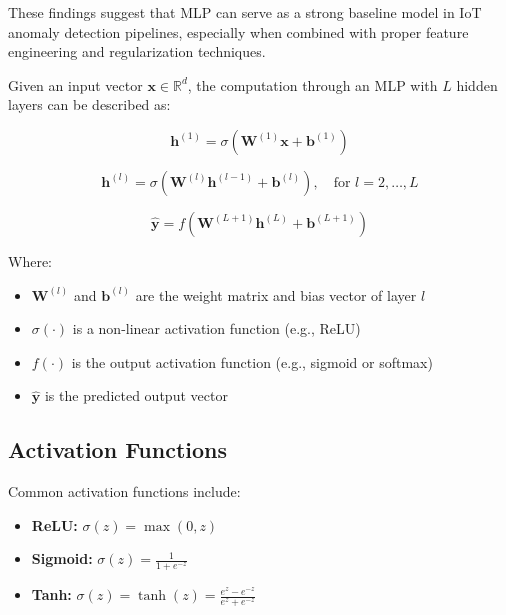 \begin{ZhChapter}
These findings suggest that MLP can serve as a strong baseline model in IoT anomaly detection pipelines, especially when combined with proper feature engineering and regularization techniques.

Given an input vector $\mathbf{x} \in \mathbb{R}^d$, the computation through an MLP with $L$ hidden layers can be described as:

\begin{equation}
    \mathbf{h}^{(1)} = \sigma\left( \mathbf{W}^{(1)} \mathbf{x} + \mathbf{b}^{(1)} \right)
    \label{eq:mlp_layer1}
\end{equation}

\begin{equation}
    \mathbf{h}^{(l)} = \sigma\left( \mathbf{W}^{(l)} \mathbf{h}^{(l-1)} + \mathbf{b}^{(l)} \right), \quad \text{for } l=2, \dots, L
    \label{eq:mlp_hidden}
\end{equation}

\begin{equation}
    \hat{\mathbf{y}} = f\left( \mathbf{W}^{(L+1)} \mathbf{h}^{(L)} + \mathbf{b}^{(L+1)} \right)
    \label{eq:mlp_output}
\end{equation}

Where:
\begin{itemize}
    \item $\mathbf{W}^{(l)}$ and $\mathbf{b}^{(l)}$ are the weight matrix and bias vector of layer $l$
    \item $\sigma(\cdot)$ is a non-linear activation function (e.g., ReLU)
    \item $f(\cdot)$ is the output activation function (e.g., sigmoid or softmax)
    \item $\hat{\mathbf{y}}$ is the predicted output vector
\end{itemize}

\subsection{Activation Functions}

Common activation functions include:

\begin{itemize}
    \item \textbf{ReLU:} $\sigma(z) = \max(0, z)$
    \item \textbf{Sigmoid:} $\sigma(z) = \frac{1}{1 + e^{-z}}$
    \item \textbf{Tanh:} $\sigma(z) = \tanh(z) = \frac{e^z - e^{-z}}{e^z + e^{-z}}$
\end{itemize}


\end{ZhChapter}
